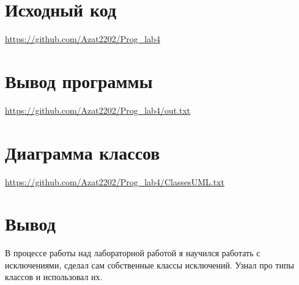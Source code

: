 \documentclass[12pt]{article}
\begin{document}
    \section{Исходный код}
    \url{ https://github.com/Azat2202/Prog_lab4}
    \newpage
    \section{Вывод программы}
    \url{ https://github.com/Azat2202/Prog_lab4/out.txt}
    \newpage
    \section{Диаграмма классов}
    \url{ https://github.com/Azat2202/Prog_lab4/ClassesUML.txt}
    \newpage
    \section{Вывод}
    В процессе работы над лабораторной работой я научился работать с исключениями, сделал сам собственные классы исключений.
    Узнал про типы классов и использовал их.
\end{document}
